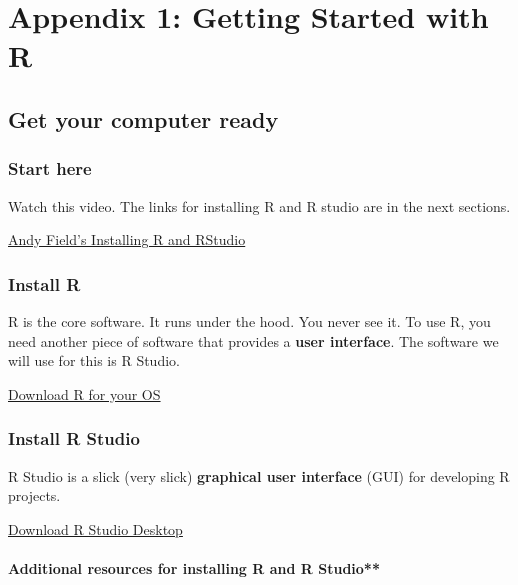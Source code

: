 \documentclass[]{book}
\begin{document}
\hypertarget{appendix-1-getting-started-with-r}{%
\chapter*{Appendix 1: Getting Started with R}\label{appendix-1-getting-started-with-r}}

\hypertarget{get-your-computer-ready}{%
\section{Get your computer ready}\label{get-your-computer-ready}}

\hypertarget{start-here}{%
\subsection{Start here}\label{start-here}}

Watch this video. The links for installing R and R studio are in the next sections.

\href{https://www.youtube.com/watch?v=ZvPFKfNHBNQ}{Andy Field's Installing R and RStudio}

\hypertarget{install-r}{%
\subsection{Install R}\label{install-r}}

R is the core software. It runs under the hood. You never see it. To use R, you need another piece of software that provides a \textbf{user interface}. The software we will use for this is R Studio.

\href{https://cran.r-project.org}{Download R for your OS}

\hypertarget{install-r-studio}{%
\subsection{Install R Studio}\label{install-r-studio}}

R Studio is a slick (very slick) \textbf{graphical user interface} (GUI) for developing R projects.

\href{https://www.rstudio.com/products/rstudio/download/}{Download R Studio Desktop}

\hypertarget{additional-resources-for-installing-r-and-r-studio}{%
\subsubsection{Additional resources for installing R and R Studio**}\label{additional-resources-for-installing-r-and-r-studio}}
\end{document}
